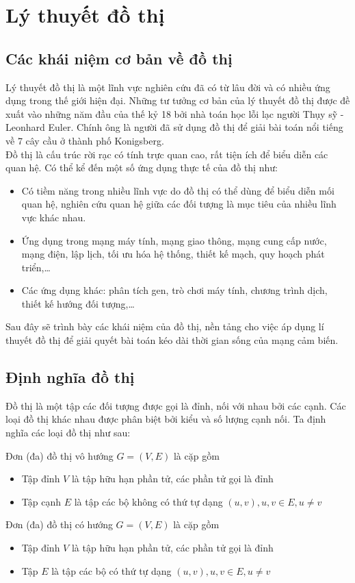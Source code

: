 \section{Lý thuyết đồ thị}
\subsection{Các khái niệm cơ bản về đồ thị}
Lý thuyết đồ thị là một lĩnh vực nghiên cứu đã có từ lâu đời và có nhiều ứng dụng trong thế giới hiện đại. Những tư tưởng cơ bản của lý thuyết đồ thị được đề xuất vào những năm đầu của thế kỷ 18 bởi nhà toán học lỗi lạc người Thụy sỹ - Leonhard Euler. Chính ông là người đã sử dụng đồ thị để giải bài toán nổi tiếng về 7 cây cầu ở thành phố Konigsberg.
\\Đồ thị là cấu trúc rời rạc có tính trực quan cao, rất tiện ích để biểu diễn các quan hệ. Có thể kể đến một số ứng dụng thực tế của đồ thị như:
\begin{itemize}
    \item Có tiềm năng trong nhiều lĩnh vực do đồ thị có thể dùng để biểu diễn mối quan hệ, nghiên cứu quan hệ giữa các đối tượng là mục tiêu của nhiều lĩnh vực khác nhau.
    \item Ứng dụng trong mạng máy tính, mạng giao thông, mạng cung cấp nước, mạng điện, lập lịch, tối ưu hóa hệ thống, thiết kế mạch, quy hoạch phát triển,…
    \item Các ứng dụng khác: phân tích gen, trò chơi máy tính, chương trình dịch, thiết kế hướng đối tượng,…
\end{itemize}
Sau đây sẽ trình bày các khái niệm của đồ thị, nền tảng cho việc áp dụng lí thuyết đồ thị để giải quyết bài toán kéo dài thời gian sống của mạng cảm biến.
\subsection{Định nghĩa đồ thị}
Đồ thị là một tập các đối tượng được gọi là đỉnh, nối với nhau bởi các cạnh. Các loại đồ thị khác nhau được phân biệt bởi kiểu và số lượng cạnh nối. Ta định nghĩa các loại đồ thị như sau:

Đơn (đa) đồ thị vô hướng $G = (V, E)$ là cặp gồm 
\begin{itemize}
    \item Tập đỉnh $V$ là tập hữu hạn phần tử, các phần tử gọi là đỉnh 
    \item Tập cạnh $E$ là tập các bộ không có thứ tự dạng $(u, v), u, v \in E, u \neq v$
\end{itemize}
Đơn (đa) đồ thị có hướng $G = (V, E)$ là cặp gồm 
\begin{itemize}
    \item Tập đỉnh $V$ là tập hữu hạn phần tử, các phần tử gọi là đỉnh 
    \item Tập $E$ là tập các bộ có thứ tự dạng $(u, v), u, v \in E, u \neq v    $
\end{itemize}
